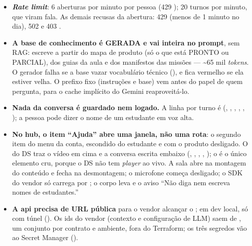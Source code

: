 \begin{itemize}
    (), e não numa linha semeada, porque
     é NOT NULL com FK para  e numa
    \emph{stack} nova não há quem assine. O  liga por escola ou rede; o
    encerrar escapa do interruptor (), para que
    desligar não deixe a sala cobrando. Lançar é tirar da lista, e muda o padrão
    de todas as redes de uma vez.
  \item \textbf{\emph{Rate limit}}: 6 aberturas por minuto por pessoa (429
    ); 20 turnos por minuto, que viram fala. As demais
    recusas da abertura: 429  (menos de 1 minuto no dia), 502
     e 403 .
  \item \textbf{A base de conhecimento é GERADA e vai inteira no prompt},
    sem RAG:  escreve
     a partir do mapa de produto (só o que está
    PRONTO ou PARCIAL), dos guias da aula e dos manifestos das missões ---
    \textasciitilde65 mil \emph{tokens}. O gerador falha se a base vazar
    vocabulário técnico (), e
     fica vermelho se ela estiver velha. O
    prefixo fixo (instruções e base) vem antes do papel de quem pergunta, para o
    cache implícito do Gemini reaproveitá-lo.
  \item \textbf{Nada da conversa é guardado nem logado.} A linha por turno é
     (, , , ,
    , ); a pessoa pode dizer o nome de um estudante em
    voz alta.
  \item \textbf{No hub, o item \enquote{Ajuda} abre uma janela, não uma rota}:
    o segundo item do menu da conta, escondido do estudante e com o produto
    desligado. O  do DS traz o vídeo em cima e a conversa escrita
    embaixo (, , ,
    , ); o  é o único elemento cru,
    porque o DS não tem \emph{player} ao vivo. A sala abre na montagem do
    conteúdo e fecha na desmontagem; o microfone começa desligado; o SDK do
    vendor só carrega por ; o corpo leva  e o
    aviso \enquote{Não diga nem escreva nomes de estudantes.}
  \item \textbf{A api precisa de URL pública} para o vendor alcançar o
    ; em dev local, só com túnel (). Os ids do
    vendor (contexto e configuração de LLM) saem de
    , um conjunto por contrato e
    ambiente, fora do Terraform; os três segredos vão ao Secret Manager
    ().
\end{itemize}


